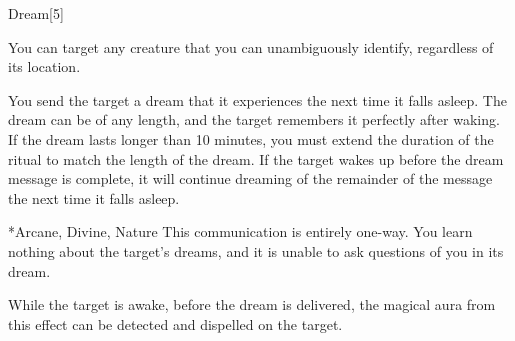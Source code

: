 \begin{spellsection}{Dream}[5]
    \begin{spellheader}
    \end{spellheader}
    \begin{spellcontent}
        \begin{spelltargetinginfo}
            \spellspecial You can target any creature that you can unambiguously identify, regardless of its location.
        \end{spelltargetinginfo}
        \begin{spelleffects}
            \spelleffect You send the target a dream that it experiences the next time it falls asleep. The dream can be of any length, and the target remembers it perfectly after waking. If the dream lasts longer than 10 minutes, you must extend the duration of the ritual to match the length of the dream. If the target wakes up before the dream message is complete, it will continue dreaming of the remainder of the message the next time it falls asleep.
        \end{spelleffects}
    \end{spellcontent}
    \begin{spellfooter}
        *{Arcane, Divine, Nature}
        \spellnotes This communication is entirely one-way. You learn nothing about the target's dreams, and it is unable to ask questions of you in its dream.

        While the target is awake, before the dream is delivered, the magical aura from this effect can be detected and dispelled on the target.
    \end{spellfooter}
\end{spellsection}

